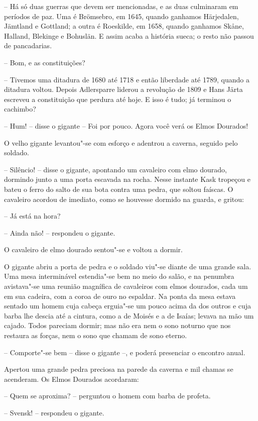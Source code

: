 -- Há só duas guerras que devem ser mencionadas, e as duas culminaram em
períodos de paz. Uma é Brömsebro, em 1645, quando ganhamos Härjedalen,
Jämtland e Gottland; a outra é Roeskilde, em 1658, quando ganhamos
Sk\r ane, Halland, Blekinge e Bohuslän. E assim acaba a história sueca; o
resto não passou de pancadarias.

-- Bom, e as constituições?

-- Tivemos uma ditadura de 1680 até 1718 e então liberdade até 1789,
quando a ditadura voltou. Depois Adlersparre liderou a revolução de
1809 e Hans Järta escreveu a constituição que perdura até hoje. E isso
é tudo; já terminou o cachimbo?

-- Hum! -- disse o gigante -- Foi por pouco. Agora você verá os Elmos
Dourados!

O velho gigante levantou"-se com esforço e adentrou a caverna, seguido
pelo soldado.

-- Silêncio! -- disse o gigante, apontando um cavaleiro com elmo dourado,
dormindo junto a uma porta escavada na rocha. Nesse instante Kask
tropeçou e bateu o ferro do salto de sua bota contra uma pedra, que
soltou faíscas. O cavaleiro acordou de imediato, como se houvesse
dormido na guarda, e gritou:

-- Já está na hora?

-- Ainda não! -- respondeu o gigante.

O cavaleiro de elmo dourado sentou"-se e voltou a dormir. 

O gigante abriu a porta de pedra e o soldado viu"-se diante de uma
grande sala. Uma mesa interminável estendia"-se bem no meio do salão,
e na penumbra avistava"-se uma reunião magnífica de cavaleiros com
elmos dourados, cada um em sua cadeira, com a coroa de ouro no
espaldar. Na ponta da mesa estava sentado um homem cuja cabeça
erguia"-se um pouco acima da dos outros e cuja barba lhe descia até a
cintura, como a de Moisés e a de Isaías; levava na mão um cajado.
Todos pareciam dormir; mas não era nem o sono noturno que nos restaura
as forças, nem o sono que chamam de sono eterno.

-- Comporte"-se bem -- disse o gigante --, e poderá presenciar o encontro
anual.

Apertou uma grande pedra preciosa na parede da caverna e mil chamas se
acenderam. Os Elmos Dourados acordaram:

-- Quem se aproxima? -- perguntou o homem com barba de profeta.

-- Svensk! -- respondeu o gigante.

